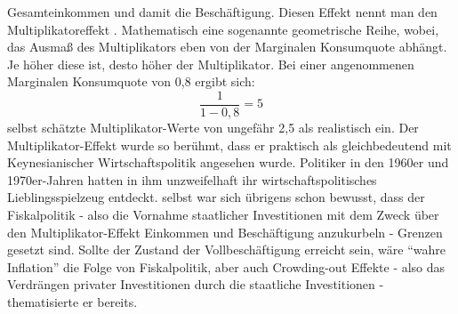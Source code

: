 Gesamteinkommen und damit die Beschäftigung. Diesen Effekt nennt man den Multiplikatoreffekt \parencite[S. 115]{Keynes1936}. Mathematisch eine sogenannte geometrische Reihe, wobei, das Ausmaß des Multiplikators eben von der Marginalen Konsumquote abhängt. Je höher diese ist, desto höher der Multiplikator. Bei einer angenommenen Marginalen Konsumquote von 0,8 ergibt sich: $$\frac{1}{1-0,8} = 5$$ \textcite[S. 128]{Keynes1936} selbst schätzte Multiplikator-Werte von ungefähr 2,5 als realistisch ein. Der Multiplikator-Effekt wurde so berühmt, dass er praktisch als gleichbedeutend mit Keynesianischer Wirtschaftspolitik angesehen wurde. Politiker in den 1960er und 1970er-Jahren hatten in ihm unzweifelhaft ihr wirtschaftspolitisches Lieblingsspielzeug entdeckt. \textcite[S. 118ff]{Keynes1936} selbst war sich übrigens schon bewusst, dass der Fiskalpolitik - also die Vornahme staatlicher Investitionen mit dem Zweck über den Multiplikator-Effekt Einkommen und Beschäftigung anzukurbeln - Grenzen gesetzt sind. Sollte der Zustand der Vollbeschäftigung erreicht sein, wäre "`wahre Inflation"' die Folge von Fiskalpolitik, aber auch Crowding-out Effekte - also das Verdrängen privater Investitionen durch die staatliche Investitionen - thematisierte er bereits.

